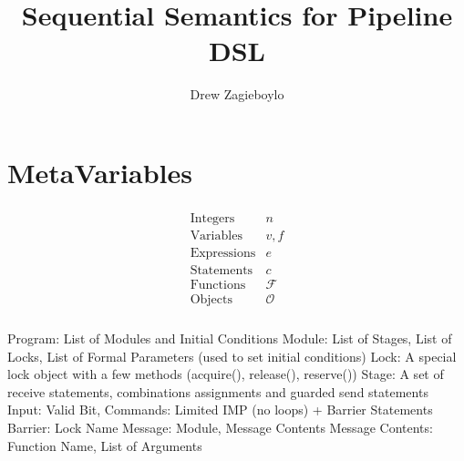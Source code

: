\documentclass{article}
\begin{document}
\title{Sequential Semantics for Pipeline DSL}
\author{Drew Zagieboylo}
\maketitle

\section{MetaVariables}
\begin{align*}
  \begin{array}{lc}
    \mbox{Integers} & n \\
    \mbox{Variables} & v,f\\
    \mbox{Expressions} & e\\
    \mbox{Statements} & c\\
    \mbox{Functions} & \mathcal{F}\\
    \mbox{Objects} & \mathcal{O}\\
  \end{array}
\end{align*}

Program: List of Modules and Initial Conditions
Module: List of Stages, List of Locks, List of Formal Parameters (used to set initial conditions)
Lock: A special lock object with a few methods (acquire(), release(), reserve())
Stage: A set of receive statements, combinations assignments and guarded send statements
Input: Valid Bit, 
Commands: Limited IMP (no loops) + Barrier Statements
Barrier: Lock Name
Message: Module, Message Contents
Message Contents: Function Name, List of Arguments

\begin{figure}[h]
\begin{syntax}
  



\end{syntax}
\end{figure}
\end{document}
